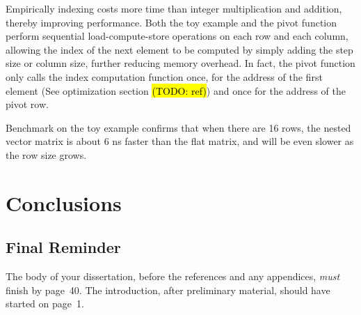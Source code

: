 \documentclass[logo,bsc,singlespacing,parskip]{infthesis}
\begin{document}
    

    


Empirically indexing costs more time than integer multiplication and addition,
thereby improving performance. Both the toy example and the pivot function
perform sequential load-compute-store operations on each row and each column,
allowing the index of the next element to be computed by simply adding the step
size or column size, further reducing memory overhead. In fact, the pivot
function only calls the index computation function once, for the address of the
first element (See optimization section \hl{(TODO: ref)}) and once for the address of the pivot
row. 

Benchmark on the toy example confirms that when there are 16 rows, the nested
vector matrix is about 6 ns faster than the flat matrix, and will be even slower
as the row size grows. 


\chapter{Conclusions}

\section{Final Reminder}

The body of your dissertation, before the references and any appendices,
\emph{must} finish by page~40. The introduction, after preliminary material,
should have started on page~1.
\end{document}
